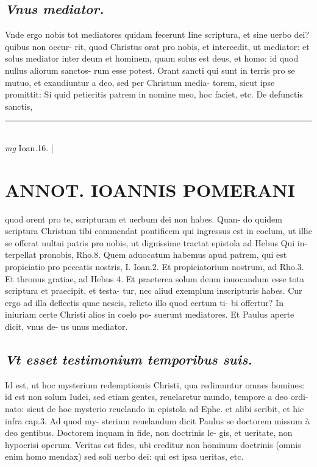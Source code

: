 \documentclass{article}
\begin{document}
\begin{pages}
\subsection*{\textit{Vnus mediator. }}\pstart Vnde ergo nobis tot mediatores quidam fecerunt Iine scriptura, et sine uerbo dei? quibus non occur- rit, quod Christus orat pro nobis, et intercedit, ut mediator: et solus mediator inter deum et hominem, quam solus est deus, et homo: id quod nullus aliorum sanctos- rum esse potest. Orant sancti qui sunt in terris pro se mutuo, et exaudiuntur a deo, sed per Christum media- torem, sicut ipse promittit: Si quid petieritis patrem in nomine meo, hoc faciet, etc. De defunctis sanctis,  \pend
\vspace{0.5cm}\noindent
\vspace{0.2cm}\rule{1cm}{0.2pt}\\ 
\hspace{0.2cm}\textit{mg}
\footnotesize Ioan.16. 
\normalsize| 
\section*{ANNOT. IOANNIS POMERANI }\pstart quod orent pro te, scripturam et uerbum dei non habes. Quan- do quidem scriptura Christum tibi commendat pontificem qui ingressus est in coelum, ut illic se offerat uultui patris pro nobis, ut dignissime tractat epistola ad Hebus  Qui in- terpellat pronobis, Rho.8. Quem aduocatum habemus apud patrem, qui est propiciatio pro peccatis nostris, I. Ioan.2. Et propiciatorium nostrum, ad Rho.3. Et thronus gratiae, ad Hebus 4. Et praeterea solum deum inuocandum esse tota scriptura et praecipit, et testa- tur, nec aliud exemplum inscripturis habes. Cur ergo ad illa deflectis quae nescis, relicto illo quod certum ti- bi offertur? In iniuriam certe Christi alios in coelo po- suerunt mediatores. Et Paulus aperte dicit, vnus de- us unus mediator.  \pend
{}
{}
\subsection*{\textit{Vt esset testimonium temporibus suis. }}\pstart Id est, ut hoc mysterium redemptiomis Christi, qua redimuntur omnes homines: id est non solum Iudei, sed etiam gentes, reuelaretur mundo, tempore a deo ordi- nato: sicut de hoc mysterio reuelando in epistola ad Ephe. et alibi scribit, et hic infra cap.3. Ad quod my- sterium reuelandum dicit Paulus se doctorem missum à deo gentibus. Doctorem inquam in fide, non doctrinis le- gis, et ueritate, non hypocrisi operum. Veritas est fides, ubi creditur non hominum doctrinis (omnis enim homo mendax) sed soli uerbo dei: qui est ipsa ueritas, etc.  \pend
{}
{}

\end{pages}
\end{document}
